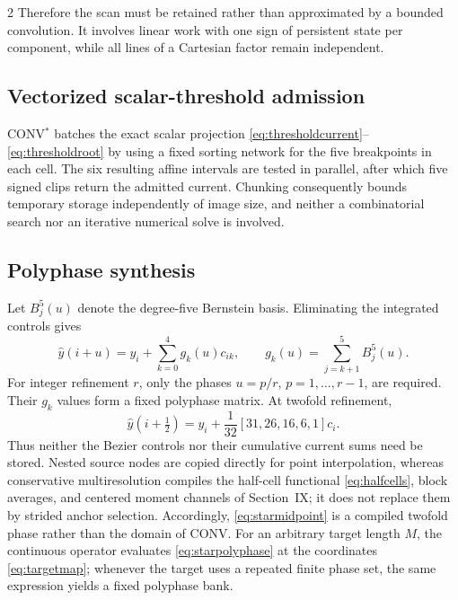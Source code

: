 \begin{multicols}{2}
Therefore the scan must be retained rather than approximated by a bounded
convolution. It involves linear work with one sign of persistent state per
component, while all lines of a Cartesian factor remain independent.

\subsection{Vectorized scalar-threshold admission}

CONV$^{*}$ batches the exact scalar projection
\eqref{eq:thresholdcurrent}--\eqref{eq:thresholdroot} by using a fixed sorting
network for the five breakpoints in each cell. The six resulting affine
intervals are tested in parallel, after which five signed clips return the
admitted current. Chunking consequently bounds temporary storage
independently of image size, and neither a combinatorial search nor an
iterative numerical solve is involved.

\subsection{Polyphase synthesis}

Let \(B_j^5(u)\) denote the degree-five Bernstein basis. Eliminating the
integrated controls gives
\begin{equation}
 \widehat y(i+u)=y_i+\sum_{k=0}^{4}g_k(u)c_{ik},\qquad
 g_k(u)=\sum_{j=k+1}^{5}B_j^5(u).
 \label{eq:starpolyphase}
\end{equation}
For integer refinement \(r\), only the phases \(u=p/r\),
\(p=1,\ldots,r-1\), are required. Their \(g_k\) values form a fixed
polyphase matrix. At twofold refinement,
\begin{equation}
 \widehat y(i+\tfrac12)=y_i+\frac{1}{32}
 [31,26,16,6,1]c_i.
 \label{eq:starmidpoint}
\end{equation}
Thus neither the Bezier controls nor their cumulative current sums need be
stored. Nested source nodes are copied directly for point interpolation,
whereas conservative multiresolution compiles the half-cell functional
\eqref{eq:halfcells}, block averages, and centered moment channels of
Section~IX; it does not replace them by strided anchor selection.
Accordingly, \eqref{eq:starmidpoint} is a compiled twofold phase rather than
the domain of CONV. For an arbitrary target length \(M\), the continuous
operator evaluates \eqref{eq:starpolyphase} at the coordinates
\eqref{eq:targetmap}; whenever the target uses a repeated finite phase set,
the same expression yields a fixed polyphase bank.


\end{multicols}
